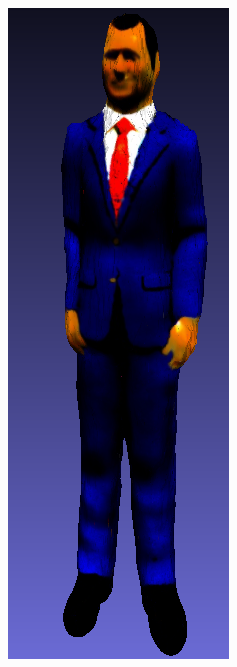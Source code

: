 \begin{figure}[H]
\begin{subfigure}[b]{0.116\textwidth}
        \caption{}
    \end{subfigure}
    \begin{subfigure}[b]{0.114\textwidth}
        \centering
        \includegraphics[width=\textwidth]{etc/bias/bias_ceo_magic3d.png}

\end{subfigure}
\end{figure}
